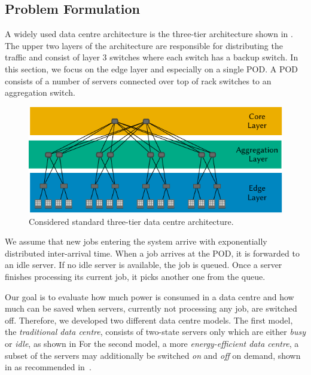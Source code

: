 \subsection{Problem Formulation}\label{sec:cloud:data_centers:problem_formulation}

A widely used data centre architecture is the three-tier architecture shown in .
The upper two layers of the architecture are responsible for distributing the traffic and consist of layer 3 switches where each switch has a backup switch.
In this section, we focus on the edge layer and especially on a single \gls{POD}.
A \gls{POD} consists of a number of servers connected over top of rack switches to an aggregation switch.

\begin{figure}
  \centering
  \includegraphics{cloud/data_centers/problem_formulation/figures/architecture}
  \caption{Considered standard three-tier data centre architecture.}
  \label{fig:cloud:data_centers:problem_formulation:3-tier_datacenter}
\end{figure}

We assume that new jobs entering the system arrive with exponentially distributed inter-arrival time.
When a job arrives at the \gls{POD}, it is forwarded to an idle server.
If no idle server is available, the job is queued.
Once a server finishes processing its current job, it picks another one from the queue.

Our goal is to evaluate how much power is consumed in a data centre and how much can be saved when servers, currently not processing any job, are switched off.
Therefore, we developed two different data centre models.
The first model, the \emph{traditional data centre}, consists of two-state servers only which are either \emph{busy} or \emph{idle}, as shown in  
For the second model, a more \emph{energy-efficient data centre}, a subset of the servers may additionally be switched \emph{on} and \emph{off} on demand, shown in  as recommended in~\cite{EPA2007}.

